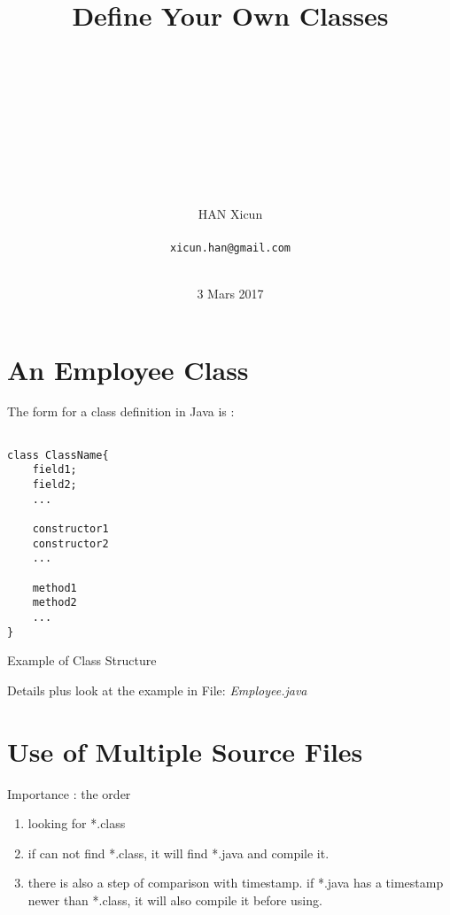 \documentclass[12pt,a4paper]{article}
\title{Define Your Own Classes}
\author{\\\\\\\\\\\\\\\\\\HAN Xicun\\\\
\texttt{xicun.han@gmail.com}\\\\}
\date{3 Mars 2017}
\begin{document}
	\pagestyle{empty}
	\maketitle
	\thispagestyle{empty}
	\clearpage

	\tableofcontents
	\newpage
	\renewcommand\listoflistingscaption{List of source codes}
	\listoflistings

	\thispagestyle{empty}
	\newpage
	\pagestyle{fancy}
	\lhead{}
	\chead{}
	\pagebreak
	\FloatBarrier


\newpage

\section{An Employee Class}

The form for a class definition in Java is : \\

\begin{listing}[ht]
 \begin{verbatim}

class ClassName{
	field1;
	field2;
	...

	constructor1
	constructor2
	...

	method1
	method2
	...
}
 \end{verbatim}
 \label{code:1}
 \caption{Example of Class Structure}
 \end{listing}
 \FloatBarrier

Details plus look at the example in File: \textit{Employee.java}\\


\section{Use of Multiple Source Files}

Importance : the order \\

\begin{enumerate}
	\item looking for *.class
	\item if can not find *.class, it will find *.java and compile it.
	\item there is also a step of comparison with timestamp. if *.java has a timestamp newer than *.class, it will also compile it before using.
\end{enumerate}
\end{document}
